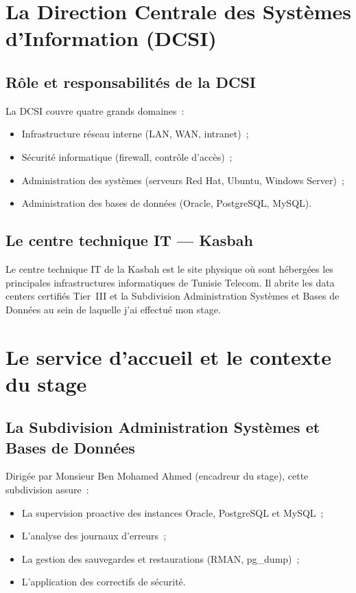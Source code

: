 \documentclass[12pt,a4paper]{report}
\begin{document}
\section{La Direction Centrale des Syst\`emes d'Information (DCSI)}

\subsection{R\^ole et responsabilit\'es de la DCSI}

La DCSI couvre quatre grands domaines~:
\begin{itemize}[leftmargin=*]
  \item Infrastructure r\'eseau interne (LAN, WAN, intranet)~;
  \item S\'ecurit\'e informatique (firewall, contr\^ole d'acc\`es)~;
  \item Administration des syst\`emes (serveurs Red Hat, Ubuntu, Windows Server)~;
  \item Administration des bases de donn\'ees (Oracle, PostgreSQL, MySQL).
\end{itemize}

\subsection{Le centre technique IT --- Kasbah}

Le centre technique IT de la Kasbah est le site physique o\`u sont h\'eberg\'ees
les principales infrastructures informatiques de Tunisie Telecom. Il abrite les
data centers certifi\'es Tier~III et la Subdivision Administration Syst\`emes et
Bases de Donn\'ees au sein de laquelle j'ai effectu\'e mon stage.

\section{Le service d'accueil et le contexte du stage}

\subsection{La Subdivision Administration Syst\`emes et Bases de Donn\'ees}

Dirig\'ee par Monsieur Ben Mohamed Ahmed (encadreur du stage), cette subdivision
assure~:
\begin{itemize}[leftmargin=*]
  \item La supervision proactive des instances Oracle, PostgreSQL et MySQL~;
  \item L'analyse des journaux d'erreurs~;
  \item La gestion des sauvegardes et restaurations (RMAN, pg\_dump)~;
  \item L'application des correctifs de s\'ecurit\'e.
\end{itemize}
\end{document}
